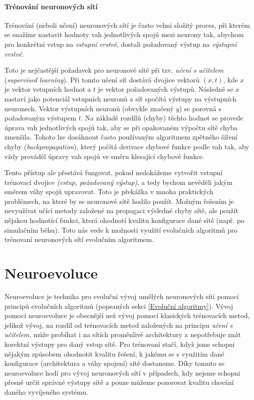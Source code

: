 \paragraph{Trénování neuronových sítí}
Trénování (neboli učení) neuronových sítí je často velmi složitý proces, při
kterém se snažíme nastavit hodnoty vah jednotlivých spojů mezi neurony tak,
abychom pro konkrétní vstup na \emph{vstupní vrstvě}, dostali požadovaný výstup
na \emph{výstupní vrstvě}. 

Toto je nejčastější požadavek pro neuronové sítě při tzv. \emph{učení s
učitelem} (\emph{supervised learning}). Při tomto učení síť dostává dvojice
vektorů $(x, t)$, kde $x$ je vektor vstupních hodnot a $t$ je vektor
požadovaných výstupů. Následně se $x$ nastaví jako potenciál vstupních neuronů
a síť spočítá výstupy na výstupních neuronech. Vektor výstupních neuronů
(obvykle značený $y$) se porovná s požadovaným výstupem $t$. Na základě rozdílů
(chyby) těchto hodnot se provede úprava vah jednotlivých spojů tak, aby se při
opakovaném výpočtu sítě chyba zmenšila. Tohoto lze dosáhnout často používaným
algoritmem zpětného šíření chyby (\emph{backpropagation}), který počítá
derivace chybové funkce podle vah tak, aby vždy prováděl úpravy vah spojů ve
směru klesající chybové funkce.

Tento přístup ale přestává fungovat, pokud nedokážeme vytvořit vstupní
trénovací dvojice \emph{(vstup, požadovaný výstup)}, a tedy bychom nevěděli jakým
směrem váhy spojů upravovat. Toto je překážka v mnoha praktických problémech,
na které by se neuronové sítě hodilo použít. Možným řešením je nevyužívat učící
metody založené na propagaci výsledné chyby sítě, ale použít nějakou hodnotící
funkci, která ohodnotí kvalitu konfigurace dané sítě (např. po simulačním
běhu). Toto nás vede k možnosti využití evolučních algoritmů pro trénovaní
neuronových sítí evolučním algoritmem.

\section{Neuroevoluce} \label{NN - evolve}
Neuroevoluce \citet{Lehman:2013} je technika pro evoluční vývoj umělých
neuronových sítí pomocí principů evolučních algoritmů (popsaných sekci
\ref{Evoluční algoritmy}). Vývoj pomocí neuroevoluce je obecnější než vývoj
pomocí klasických trénovacích metod, jelikož vývoj, na rozdíl od trénovacích
metod založených na principu \emph{učení s učitelem}, může probíhat i na sítích
proměnlivé architektury a nepotřebuje znát korektní výstupy pro daný vstup
sítě. Pro trénovaní stačí, když jsme schopni nějakým způsobem ohodnotit kvalitu
řešení, k jakému se s využitím dané konfigurace (architektura a váhy spojení)
sítě dostaneme. Díky tomuto se neuroevoluce hodí pro vývoj neuronových sítí v
případech, kdy nejsme schopni přesně určit správné výstupy sítě a pouze můžeme
pozorovat kvalitu chování daného vyvíjeného systému.

